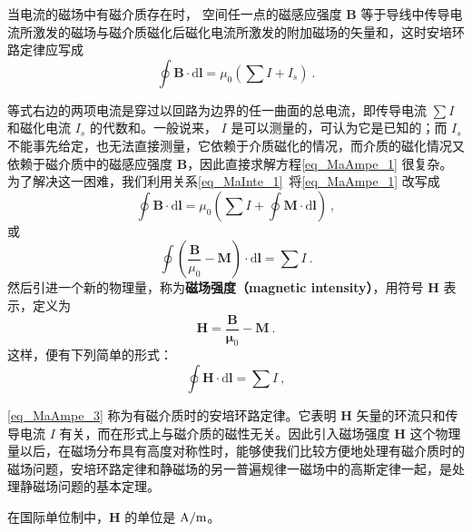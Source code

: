 

当电流的磁场中有磁介质存在时， 空间任一点的磁感应强度 $\mathbf B $ 等于导线中传导电流所激发的磁场与磁介质磁化后磁化电流所激发的附加磁场的矢量和，这时安培环路定律应写成
\begin{equation} \label{eq_MaAmpe_1}
\oint \mathbf{B} \cdot \mathrm{d} \mathbf{l}=\mu_{0}\left(\sum I+I_{s}\right)~.
\end{equation}

等式右边的两项电流是穿过以回路为边界的任一曲面的总电流，即传导电流 $\sum I$ 和磁化电流 $I_s$ 的代数和。一般说来， $I $ 是可以测量的，可认为它是已知的；而 $I_s$ 不能事先给定，也无法直接测量，它依赖于介质磁化的情况，而介质的磁化情况又依赖于磁介质中的磁感应强度 $\mathbf B$，因此直接求解方程\autoref{eq_MaAmpe_1} 很复杂。为了解决这一困难，我们利用关系\autoref{eq_MaInte_1}~将\autoref{eq_MaAmpe_1} 改写成
\begin{equation}
\oint \mathbf{B} \cdot \mathrm{d} \mathbf{l}=\mu_{0}\left(\sum I+\oint \mathbf{M} \cdot \mathrm{d} \mathbf{l}\right)~,
\end{equation}
或
\begin{equation} 
\oint\left(\frac{\mathbf{B}}{\mu_{0}}-\mathbf{M}\right) \cdot \mathrm{d} \mathbf{l}=\sum I~.
\end{equation}
然后引进一个新的物理量，称为\textbf{磁场强度（magnetic intensity）}，用符号 $\mathbf H$ 表示，定义为
\begin{equation} \label{eq_MaAmpe_2}
\mathbf{H}=\frac{\mathbf{B}}{\mathbf{\mu}_{0}}-\mathbf{M}~.
\end{equation}
这样，便有下列简单的形式： 
\begin{equation} \label{eq_MaAmpe_3}
\oint \mathbf{H} \cdot \mathrm{d} \mathbf{l}=\sum I~,
\end{equation}

\autoref{eq_MaAmpe_3} 称为有磁介质时的安培环路定律。它表明 $\mathbf H $ 矢量的环流只和传导电流 $I $ 有关，而在形式上与磁介质的磁性无关。因此引入磁场强度 $\mathbf H $ 这个物理量以后，在磁场分布具有高度对称性时，能够使我们比较方便地处理有磁介质时的磁场问题，安培环路定律和静磁场的另一普遍规律一磁场中的高斯定律一起，是处理静磁场问题的基本定理。

在国际单位制中，$\mathbf  H $ 的单位是 $\rm A/m$。

